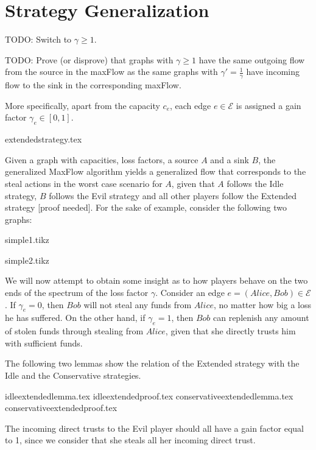 \section{Strategy Generalization}
  TODO: Switch to $\gamma \geq 1$.

  TODO: Prove (or disprove) that graphs with $\gamma \geq 1$ have the same outgoing flow from the source in the maxFlow as the
  same graphs with $\gamma' = \frac{1}{\gamma}$ have incoming flow to the sink in the corresponding maxFlow.

  More specifically, apart from the capacity $c_e$, each edge $e \in \mathcal{E}$ is assigned a gain factor $\gamma_e \in
  \left[0, 1\right]$. 
  
  {extendedstrategy.tex}

  Given a graph with capacities, loss factors, a source $A$ and a sink $B$, the generalized MaxFlow algorithm yields a
  generalized flow that corresponds to the steal actions in the worst case scenario for $A$, given that $A$ follows the Idle
  strategy, $B$ follows the Evil strategy and all other players follow the Extended strategy [proof needed]. For the sake of
  example, consider the following two graphs:
  
  {simple1.tikz}

  {simple2.tikz}

  We will now attempt to obtain some insight as to how players behave on the two ends of the spectrum of the loss factor
  $\gamma$. Consider an edge $e = \left(Alice, Bob\right) \in \mathcal{E}$. If $\gamma_e = 0$, then $Bob$ will not steal any
  funds from $Alice$, no matter how big a loss he has suffered. On the other hand, if $\gamma_e = 1$, then $Bob$ can replenish
  any amount of stolen funds through stealing from $Alice$, given that she directly trusts him with sufficient funds.
  
  The following two lemmas show the relation of the Extended strategy with the Idle and the Conservative strategies.
  
  {idleextendedlemma.tex}
  {idleextendedproof.tex}
  {conservativeextendedlemma.tex}
  {conservativeextendedproof.tex}

  The incoming direct trusts to the Evil player should all have a gain factor equal to 1, since we consider that she steals all
  her incoming direct trust.

